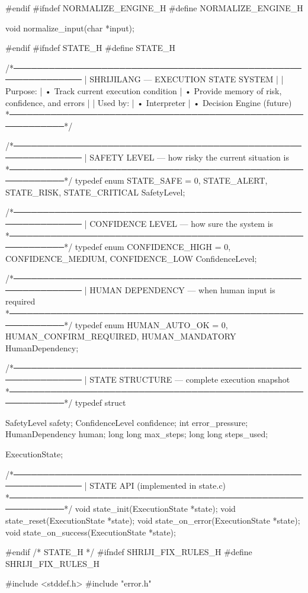\documentclass{article}
\begin{document}
#endif
#ifndef NORMALIZE_ENGINE_H
#define NORMALIZE_ENGINE_H

void normalize_input(char *input);

#endif
#ifndef STATE_H
#define STATE_H

/*──────────────────────────────────────────────────────────────
 |  SHRIJILANG — EXECUTION STATE SYSTEM
 |
 |  Purpose:
 |   • Track current execution condition
 |   • Provide memory of risk, confidence, and errors
 |
 |  Used by:
 |   • Interpreter
 |   • Decision Engine (future)
 *────────────────────────────────────────────────────────────*/

/*──────────────────────────────────────────────────────────────
 |  SAFETY LEVEL — how risky the current situation is
 *────────────────────────────────────────────────────────────*/
typedef enum {
    STATE_SAFE = 0,
    STATE_ALERT,
    STATE_RISK,
    STATE_CRITICAL
} SafetyLevel;


/*──────────────────────────────────────────────────────────────
 |  CONFIDENCE LEVEL — how sure the system is
 *────────────────────────────────────────────────────────────*/
typedef enum {
    CONFIDENCE_HIGH = 0,
    CONFIDENCE_MEDIUM,
    CONFIDENCE_LOW
} ConfidenceLevel;


/*──────────────────────────────────────────────────────────────
 |  HUMAN DEPENDENCY — when human input is required
 *────────────────────────────────────────────────────────────*/
typedef enum {
    HUMAN_AUTO_OK = 0,
    HUMAN_CONFIRM_REQUIRED,
    HUMAN_MANDATORY
} HumanDependency;


/*──────────────────────────────────────────────────────────────
 |  STATE STRUCTURE — complete execution snapshot
 *────────────────────────────────────────────────────────────*/
typedef struct {
    SafetyLevel      safety;
    ConfidenceLevel  confidence;
    int              error_pressure;
    HumanDependency  human;
long long max_steps;
long long steps_used;

} ExecutionState;


/*──────────────────────────────────────────────────────────────
 |  STATE API (implemented in state.c)
 *────────────────────────────────────────────────────────────*/
void state_init(ExecutionState *state);
void state_reset(ExecutionState *state);
void state_on_error(ExecutionState *state);
void state_on_success(ExecutionState *state);

#endif /* STATE_H */
#ifndef SHRIJI_FIX_RULES_H
#define SHRIJI_FIX_RULES_H

#include <stddef.h>
#include "error.h"
\end{document}
